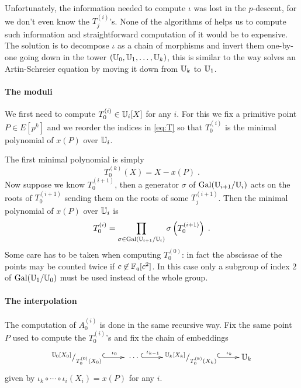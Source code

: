 Unfortunately, the information needed to compute $\iota$ was lost in
the $p$-descent, for we don't even know the $T_j^{(i)}$'s. None of the
algorithms of \cite{DFS09} helps us to compute such information and
straightforward computation of it would be to expensive. The solution
is to decompose $\iota$ as a chain of morphisms and invert them
one-by-one going down in the tower $(\mathbb{U}_0,\mathbb{U}_1,\ldots,\mathbb{U}_k)$, this is
similar to the way \cite{Cou00} solves an Artin-Schreier equation by
moving it down from $\mathbb{U}_k$ to $\mathbb{U}_1$.

\paragraph{The moduli}
We first need to compute $T_0^{(i)}\in\mathbb{U}_i[X]$ for any $i$. For this
we fix a primitive point $P\in E[p^k]$ and we reorder the indices in
\eqref{eq:T} so that $T_0^{(i)}$ is the minimal polynomial of $x(P)$
over $\mathbb{U}_i$.

The first minimal polynomial is simply
\begin{equation}
  \label{eq:T_0^k}
  T_0^{(k)}(X) = X - x(P)
  \;\text{.}
\end{equation}
Now suppose we know $T_0^{(i+1)}$, then a generator $\sigma$ of
$\operatorname{Gal}(\mathbb{U}_{i+1}/\mathbb{U}_i)$ acts on the roots of $T_0^{(i+1)}$ sending them
on the roots of some $T_j^{(i+1)}$. Then the
minimal polynomial of $x(P)$ over $\mathbb{U}_i$ is
\begin{equation}
  \label{eq:T_0^i}
  T_0^{(i)} = \prod_{\sigma\in\operatorname{Gal}(\mathbb{U}_{i+1}/\mathbb{U}_i)} \sigma\left(T_0^{(i+1)}\right)
  \;\text{.}
\end{equation}
Some care has to be taken when computing $T_0^{(0)}$: in fact the
abscissae of the points may be counted twice if
$c\not\in\mathbb{F}_q[c^2]$. In this case only a subgroup of index $2$ of
$\operatorname{Gal}(\mathbb{U}_1/\mathbb{U}_0)$ must be used instead of the whole group.


\paragraph{The interpolation}
The computation of $A_0^{(i)}$ is done in the same recursive way. Fix
the same point $P$ used to compute the $T_0^{(i)}$'s and fix the chain
of embeddings
\begin{equation}
  \xymatrix{
    ^{\U_0[X_0]}/_{T_0^{(0)}(X_0)} \ar@{^{(}->}[r]^-{\iota_0} &
    \;\cdots\; \ar@{^{(}->}[r]^-{\iota_{k-1}} &
    ^{\U_k[X_k]}/_{T_0^{(k)}(X_k)} \ar@{^{(}->}[r]^-{\iota_k} &
    \U_k
  }
\end{equation}
given by $\iota_k\circ\cdots\circ\iota_i(X_i) = x(P)$ for any $i$.

